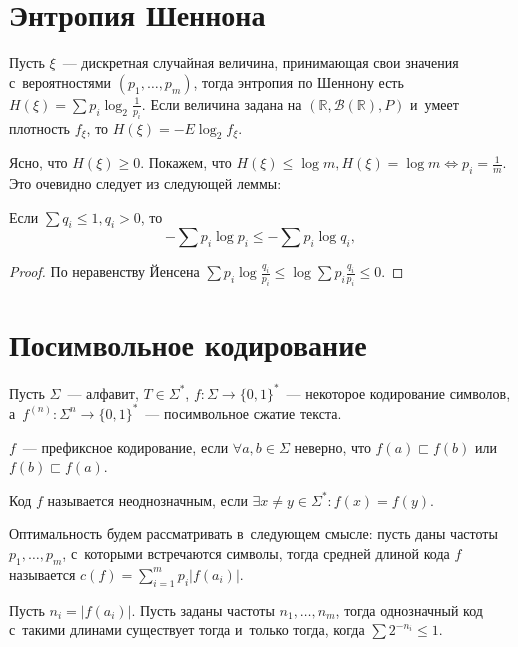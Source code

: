\documentclass{article}
\begin{document}
\section{Энтропия Шеннона}

Пусть $\xi$~--- дискретная случайная величина, принимающая свои значения
с~вероятностями $(p_1, \ldots, p_m)$, тогда энтропия по Шеннону есть $H(\xi) =
\sum p_i \log_2 \frac{1}{p_i}$. Если величина задана на $(\mathbb{R},
\mathcal{B}(\mathbb{R}), P)$ и~умеет плотность $f_\xi$, то $H(\xi) = -E \log_2
f_\xi$.

Ясно, что $H(\xi) \ge 0$. Покажем, что $H(\xi) \le \log m, H(\xi) = \log m
\Leftrightarrow p_i = \frac{1}{m}$. Это очевидно следует из следующей леммы:

\begin{lemma}
	Если $\sum q_i \le 1, q_i > 0$, то
	$$-\sum p_i \log p_i \le -\sum p_i \log q_i,$$
\end{lemma}
\begin{proof}
	По неравенству Йенсена $\sum p_i \log \frac{q_i}{p_i} \le \log \sum p_i
	\frac{q_i}{p_i} \le 0$.
\end{proof}

\section{Посимвольное кодирование}

Пусть $\Sigma$~--- алфавит, $T \in \Sigma^\ast$, $f: \Sigma \rightarrow \{0,
1\}^\ast$~--- некоторое кодирование символов, а~$f^{(n)}: \Sigma^n \rightarrow
\{0,1\}^\ast$~--- посимвольное сжатие текста.

\begin{definition}
	$f$~--- префиксное кодирование, если $\forall a, b \in \Sigma$ неверно, что
	$f(a) \sqsubset f(b)$ или $f(b) \sqsubset f(a)$.
\end{definition}

\begin{definition}
	Код $f$ называется неоднозначным, если $\exists x \ne y \in \Sigma^\ast: f(x)
	= f(y)$.
\end{definition}

Оптимальность будем рассматривать в~следующем смысле: пусть даны частоты $p_1,
\ldots, p_m$, с~которыми встречаются символы, тогда средней длиной кода $f$
называется $c(f) = \sum\limits_{i=1}^m p_i |f(a_i)|$.

\begin{lemma}
	Пусть $n_i = |f(a_i)|$. Пусть заданы частоты $n_1, \ldots, n_m$, тогда
	однозначный код с~такими длинами существует тогда и~только тогда, когда $\sum
	2^{-n_i} \le 1$.
\end{lemma}
\end{document}
